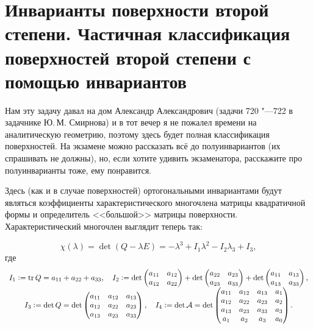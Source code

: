 \section{Инварианты поверхности второй степени. Частичная классификация поверхностей второй степени с помощью инвариантов}

Нам эту задачу давал на дом Александр Александрович (задачи 720 "---722 в задачнике Ю.\,М. Смирнова) и в тот вечер я не пожалел времени на аналитическую геометрию, поэтому здесь будет полная классификация поверхностей. На экзамене можно рассказать всё до полуинвариантов (их спрашивать не должны), но, если хотите удивить экзаменатора, расскажите про полуинварианты тоже, ему понравится.

Здесь (как и в случае поверхностей) ортогональными инвариантами будут являться коэффициенты характеристического многочлена матрицы квадратичной формы и определитель <<большой>> матрицы поверхности. Характеристический многочлен выглядит теперь так:

$$
\chi(\lambda) = \det(Q - \lambda E) = -\lambda^3 + I_1\lambda^2 - I_2\lambda_3 + I_3,
$$
где
$$
\begin{array}{c}\displaystyle
    I_1 \vcentcolon = \mathrm{tr}\, Q = a_{11} + a_{22} + a_{33},\quad I_2 \vcentcolon = \det
    \begin{pmatrix}
        a_{11} & a_{12}\\
        a_{12} & a_{22}
    \end{pmatrix} + \det
    \begin{pmatrix}
        a_{22} & a_{23}\\
        a_{23} & a_{33}
    \end{pmatrix} + \det
    \begin{pmatrix}
        a_{11} & a_{13}\\
        a_{13} & a_{33}
    \end{pmatrix},\\\displaystyle
    I_3 \vcentcolon = \det Q = \det
    \begin{pmatrix}
        a_{11} & a_{12} & a_{13}\\
        a_{12} & a_{22} & a_{23}\\
        a_{13} & a_{23} & a_{33}
    \end{pmatrix},\quad I_4 \vcentcolon = \det \mathcal{A} = 
    \det
    \begin{pmatrix}
        a_{11} & a_{12} & a_{13} & a_1\\
        a_{12} & a_{22} & a_{23} & a_2\\
        a_{13} & a_{23} & a_{33} & a_3\\
        a_1 & a_2 & a_3 & a_0
    \end{pmatrix}.
\end{array}
$$

